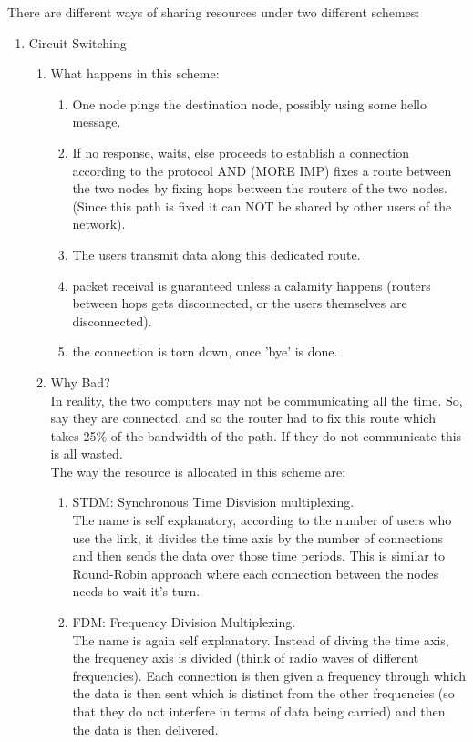\documentclass[12pt]{book}
\begin{document}
There are different ways of sharing resources under two different schemes:
\begin{enumerate}
    \item Circuit Switching
    \begin{enumerate}
        \item What happens in this scheme:
        \begin{enumerate}
            \item One node pings the destination node, possibly using some hello message.
            \item If no response, waits, else proceeds to establish a connection according to the protocol AND (MORE IMP) fixes a route between the two nodes by fixing hops between the routers of the two nodes. (Since this path is fixed it can NOT be shared by other users of the network).
            \item The users transmit data along this dedicated route.
            \item packet receival is guaranteed unless a calamity happens (routers between hops gets disconnected, or the users themselves are disconnected).
            \item the connection is torn down, once 'bye' is done.
        \end{enumerate}
        \item Why Bad?\\
            In reality, the two computers may not be communicating all the time. So, say they are connected, and so the router had to fix this route which takes 25\% of the bandwidth of the path. If they do not communicate this is all wasted.\\
            The way the resource is allocated in this scheme are:
            \begin{enumerate}
                \item STDM: Synchronous Time Disvision multiplexing.\\
                The name is self explanatory, according to the number of users who use the link, it divides the time axis by the number of connections and then sends the data over those time periods. This is similar to Round-Robin approach where each connection between the nodes needs to wait it's turn.
                \item FDM: Frequency Division Multiplexing.\\
                The name is again self explanatory. Instead of diving the time axis, the frequency axis is divided (think of radio waves of different frequencies). Each connection is then given a frequency through which the data is then sent which is distinct from the other frequencies (so that they do not interfere in terms of data being carried) and then the data is then delivered.

\end{enumerate}
\end{enumerate}
\end{enumerate}
\end{document}
